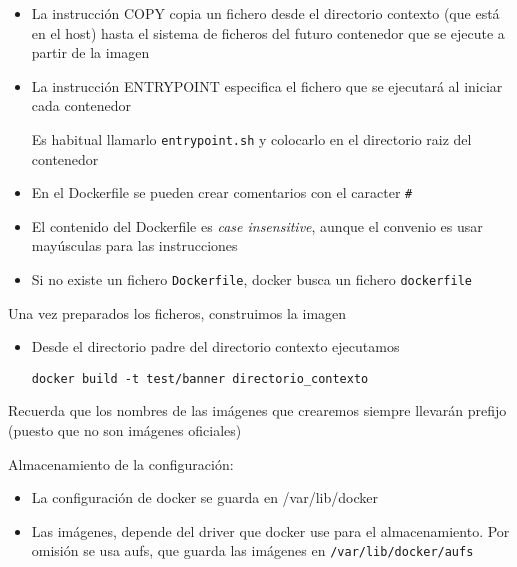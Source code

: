 \documentclass[ucs]{beamer}
\begin{document}
\begin{frame}[fragile]
\frametitle{}
\begin{itemize}
\item
La instrucción COPY copia un fichero desde el directorio contexto
(que está en el host) hasta el sistema de ficheros del futuro contenedor
que se ejecute a partir de la imagen

\item
La instrucción ENTRYPOINT especifica el fichero que se ejecutará al iniciar
cada contenedor

Es habitual llamarlo 
\verb|entrypoint.sh|
y colocarlo en el directorio raiz del contenedor

\item
En el Dockerfile se pueden crear comentarios con el caracter \verb|#|

\item
El contenido del Dockerfile  es
\emph{case insensitive},
aunque el convenio es usar mayúsculas para las instrucciones

\item

Si no existe un fichero
\verb|Dockerfile|,
docker busca un fichero
\verb|dockerfile| 
\end{itemize}


\end{frame}
\begin{frame}[fragile]
Una vez preparados los ficheros, construimos la imagen




\begin{itemize}
\item
Desde el directorio padre del directorio contexto ejecutamos

\verb|docker build -t test/banner directorio_contexto|
\end{itemize}

Recuerda que los nombres de las imágenes que crearemos siempre 
llevarán prefijo (puesto que no son imágenes oficiales)

Almacenamiento de la configuración:

\begin{itemize}
\item
La configuración de docker se guarda en /var/lib/docker

\item
Las imágenes, depende del driver que docker use para el almacenamiento.
Por omisión se usa aufs, que guarda  las imágenes en
\verb|/var/lib/docker/aufs|
\end{itemize}



\end{frame}
\end{document}
